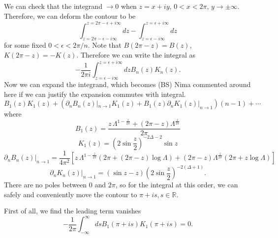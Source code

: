 \documentclass{article}
\theoremstyle{plain}
\theoremstyle{definition}
\theoremstyle{plain}
\newcommand{\BS}[1]{{\color{BSorange}\footnotesize{(BS) #1}}}
\begin{document}
We can check that the integrand $\to 0$ when $z=x+i y$, $0<x<2\pi$, $y\to \pm \infty$. Therefore, we can deform the contour to be
\begin{equation}
    \int_{z=2\pi-\epsilon-i\infty}^{z=2\pi-\epsilon+i\infty} dz - \int_{z=\epsilon-i\infty}^{z=\epsilon+i\infty} dz 
\end{equation}
for some fixed $0<\epsilon<2\pi/n$. Note that $B(2\pi-z)=B(z)$, $K(2\pi-z)=-K(z)$. Therefore we can write the integral as 
\begin{equation}
   - \frac{1}{2\pi i} \int_{z=\epsilon-i\infty}^{z=\epsilon+i\infty} dz B_n(z) K_n(z).
\end{equation}
Now we can expand the integrand, which becomes \BS{Nima commented around here if we can justify the expansion commutes with integral.}
\begin{equation}
    B_1(z)K_1(z) + \left(\partial_n B_n(z)|_{n\to 1}K_1(z)+B_1(z)\partial_n K_1(z)|_{n\to 1} \right)(n-1) +\cdots
\end{equation}
where
\begin{equation}
    B_1(z)= \frac{
z\,\Lambda^{1-\frac{z}{2\pi}}
+
(2\pi-z)\Lambda^{\frac{z}{2\pi}}
}
{2\pi}
\end{equation}
\begin{equation}
    K_1(z) =  (2\sin\frac{z}{2})^{-2\Delta-2}\sin z
\end{equation}
\begin{equation}
    \partial_n B_n(z)|_{n\to 1} = \frac{1}{4\pi^2}
\left[
z\,\Lambda^{1-\frac{z}{2\pi}}
\left(2\pi+(2\pi-z)\log\Lambda\right)
+
(2\pi-z)\Lambda^{\frac{z}{2\pi}}
\left(2\pi+z\log\Lambda\right)
\right]
\end{equation}
\begin{equation}
    \partial_n K_n(z)|_{n\to 1} =(\sin z -z)(2\sin \frac{z}{2})^{-2(\Delta+1)}.
\end{equation}
There are no poles between $0$ and $2\pi$, so for the integral at this order, we can safely and conveniently move the contour to $\pi+is,s\in\mathbb{R}$. 

First of all, we find the leading term vanishes
\begin{equation}
  -\frac{1}{2\pi} \int_{-\infty}^\infty ds B_1(\pi+is)K_1(\pi+is)=0.
\end{equation}
\end{document}
